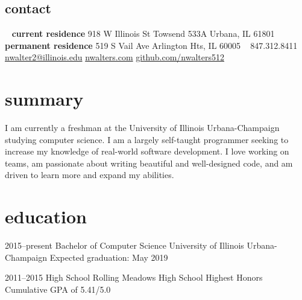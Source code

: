 \documentclass[print]{resume} %
\begin{document}


\begin{aside} %
\section{contact}
~
\textbf{current residence}
918 W Illinois St
Towsend 533A
Urbana, IL 61801
~
\textbf{permanent residence}
519 S Vail Ave
Arlington Hts, IL 60005
~
847.312.8411
~
\href{mailto:nwalter2@illinois.edu}{nwalter2@illinois.edu}
\href{http://www.nwalters.com}{nwalters.com}
\href{http://github.com/nwalters512}{github.com/nwalters512}
\end{aside}


\section{summary}

I am currently a freshman at the University of Illinois Urbana-Champaign studying computer science. I am a largely self-taught programmer seeking to increase my knowledge of real-world software development. I love working on teams, am passionate about writing beautiful and well-designed code, and am driven to learn more and expand my abilities.


\section{education}

\begin{entrylist}


\entry
{2015--present}
{Bachelor {\normalfont of Computer Science}}
{University of Illinois Urbana-Champaign}
{Expected graduation: May 2019}


\entry
{2011--2015}
{High School}
{Rolling Meadows High School}
{Highest Honors \\
Cumulative GPA of 5.41/5.0}


\end{entrylist}
\end{document}
